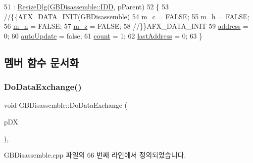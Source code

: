 \begin{DoxyCode}
51   : \mbox{\hyperlink{class_resize_dlg_a87bab778e9312f274ebe750d4c3a67ee}{ResizeDlg}}(\mbox{\hyperlink{class_g_b_disassemble_a7af15be4d057c5f04b6b51c5e8011416ab3ecbcf1d05db942d787bf38dbf7051c}{GBDisassemble::IDD}}, pParent)
52 \{
53   \textcolor{comment}{//\{\{AFX\_DATA\_INIT(GBDisassemble)}
54   \mbox{\hyperlink{class_g_b_disassemble_aa5e67e4603c41c05ed19f599336139be}{m\_c}} = FALSE;
55   \mbox{\hyperlink{class_g_b_disassemble_a2756a29fdbf8424bd977ea326b00b9e7}{m\_h}} = FALSE;
56   \mbox{\hyperlink{class_g_b_disassemble_acd44f179ab1fc59a252e21370ce183e9}{m\_n}} = FALSE;
57   \mbox{\hyperlink{class_g_b_disassemble_a3fe7947162446aea8ba1dcb1e6920b60}{m\_z}} = FALSE;
58   \textcolor{comment}{//\}\}AFX\_DATA\_INIT}
59   \mbox{\hyperlink{class_g_b_disassemble_afcfc78edb6d25dc9ef3f0ae25ac6731f}{address}} = 0;
60   \mbox{\hyperlink{class_g_b_disassemble_ac61f998dee99af2b137fe45297a5715a}{autoUpdate}} = \textcolor{keyword}{false};
61   \mbox{\hyperlink{class_g_b_disassemble_a656a8c8553caae166131f58e924129f5}{count}} = 1;
62   \mbox{\hyperlink{class_g_b_disassemble_ac1e3b7cd4e945eff2d9d89f14c4cbca9}{lastAddress}} = 0;
63 \}
\end{DoxyCode}


\subsection{멤버 함수 문서화}
\mbox{\label{class_g_b_disassemble_a38c5f5c6c903e54fb87b5c6eaa4afc73}} 
\subsubsection{\texorpdfstring{Do\+Data\+Exchange()}{DoDataExchange()}}
{\footnotesize\ttfamily void G\+B\+Disassemble\+::\+Do\+Data\+Exchange (\begin{DoxyParamCaption}\item[{C\+Data\+Exchange $\ast$}]{p\+DX }\end{DoxyParamCaption})\hspace{0.3cm}{\ttfamily [protected]}, {\ttfamily [virtual]}}



G\+B\+Disassemble.\+cpp 파일의 66 번째 라인에서 정의되었습니다.


